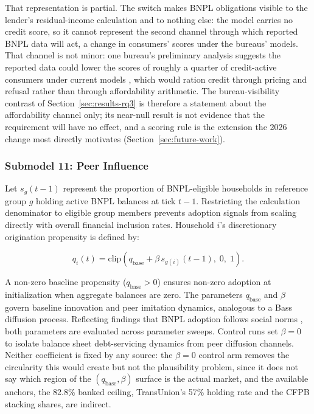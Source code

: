 That representation is partial.
The switch makes \ac{BNPL} obligations visible to the lender's residual-income calculation and to nothing else: the model carries no credit score, so it cannot represent the second channel through which reported \ac{BNPL} data will act, a change in consumers' scores under the bureaus' models.
That channel is not minor: one bureau's preliminary analysis suggests the reported data could lower the scores of roughly a quarter of credit-active consumers under current models \cite{finasa_bnpl_2026}, which would ration credit through pricing and refusal rather than through affordability arithmetic.
The bureau-visibility contrast of Section~\ref{sec:results-rq3} is therefore a statement about the affordability channel only; its near-null result is not evidence that the requirement will have no effect, and a scoring rule is the extension the 2026 change most directly motivates (Section~\ref{sec:future-work}).

\subsubsection*{Submodel 11: Peer Influence}
\label{sec:peer-influence}

Let $s_g(t-1)$ represent the proportion of \ac{BNPL}-eligible households in reference group $g$ holding active \ac{BNPL} balances at tick $t-1$. Restricting the calculation denominator to eligible group members prevents adoption signals from scaling directly with overall financial inclusion rates. Household $i$'s discretionary origination propensity is defined by:

\begin{equation}
    q_i(t) = \mathrm{clip}\!\left(q_{\text{base}} + \beta \, s_{g(i)}(t-1),\; 0,\; 1\right).
    \label{eq:peer}
\end{equation}

A non-zero baseline propensity ($q_{\text{base}} > 0$) ensures non-zero adoption at initialization when aggregate balances are zero.
The parameters $q_{\text{base}}$ and $\beta$ govern baseline innovation and peer imitation dynamics, analogous to a Bass diffusion process.
Reflecting findings that \ac{BNPL} adoption follows social norms \cite{ackert2025bnpl, cardaci2018inequality}, both parameters are evaluated across parameter sweeps.
Control runs set $\beta = 0$ to isolate balance sheet debt-servicing dynamics from peer diffusion channels.
Neither coefficient is fixed by any source: the $\beta = 0$ control arm removes the circularity this would create but not the plausibility problem, since it does not say which region of the $(q_{\text{base}}, \beta)$ surface is the actual market, and the available anchors, the 82.8\% banked ceiling, TransUnion's 57\% holding rate \cite{transunion_cps_sa_2025} and the \ac{CFPB} stacking shares, are indirect.

